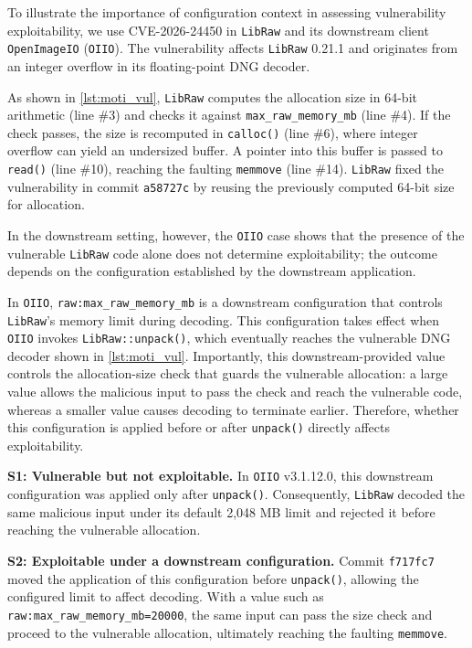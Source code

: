 To illustrate the importance of configuration context in assessing vulnerability exploitability, we use CVE-2026-24450 in \texttt{LibRaw} and its downstream client \texttt{OpenImageIO} (\texttt{OIIO}). The vulnerability affects \texttt{LibRaw} 0.21.1 and originates from an integer overflow in its floating-point DNG decoder.

As shown in \autoref{lst:moti_vul}, \texttt{LibRaw} computes the allocation size in 64-bit arithmetic (line \#3) and checks it against \texttt{max\_raw\_memory\_mb} (line \#4). If the check passes, the size is recomputed in \texttt{calloc()} (line \#6), where integer overflow can yield an undersized buffer. A pointer into this buffer is passed to \texttt{read()} (line \#10), reaching the faulting \texttt{memmove} (line \#14). \texttt{LibRaw} fixed the vulnerability in commit \texttt{a58727c} by reusing the previously computed 64-bit size for allocation.

In the downstream setting, however, the \texttt{OIIO} case shows that the presence of the vulnerable \texttt{LibRaw} code alone does not determine exploitability; the outcome depends on the configuration established by the downstream
application.

In \texttt{OIIO}, \texttt{raw:max\_raw\_memory\_mb} is a downstream configuration that controls \texttt{LibRaw}'s memory limit during decoding. This configuration takes effect when \texttt{OIIO} invokes \texttt{LibRaw::unpack()}, which eventually reaches the vulnerable DNG decoder shown in \autoref{lst:moti_vul}. Importantly, this downstream-provided value controls the allocation-size check that guards the vulnerable allocation: a large value allows the malicious input to pass the check and reach the vulnerable code, whereas a smaller value causes decoding to terminate earlier. Therefore, whether this configuration is applied before or after \texttt{unpack()} directly affects exploitability.

\vspace{5px}
\noindent\textbf{S1: Vulnerable but not exploitable.}
In \texttt{OIIO} v3.1.12.0, this downstream configuration was applied only after \texttt{unpack()}. Consequently, \texttt{LibRaw} decoded the same malicious input under its default 2,048 MB limit and rejected it before reaching the vulnerable allocation.

\vspace{5px}
\noindent\textbf{S2: Exploitable under a downstream configuration.}
Commit \texttt{f717fc7} moved the application of this configuration before \texttt{unpack()}, allowing the configured limit to affect decoding. With a value such as \texttt{raw:max\_raw\_memory\_mb=20000}, the same
input can pass the size check and proceed to the vulnerable allocation, ultimately reaching the faulting \texttt{memmove}.

